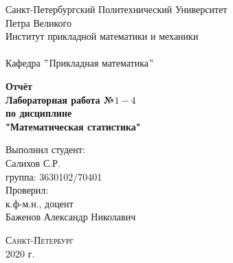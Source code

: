 \documentclass[a4]{article}
\begin{document}
	\def\contentsname{\LARGE{Содержание}}
	\thispagestyle{empty}
	\begin{center} 
		\vspace{2cm} 
		{\Large \sc Санкт-Петербургский Политехнический Университет}\\
		\vspace{2mm}
		{\Large\sc Петра Великого}\\
		\vspace{1cm}
		{\large \sc Институт прикладной математики и механики\\ 
			\vspace{0.5mm}
			\textsc{}}\\ 
		\vspace{0.5mm}
		{\large\sc Кафедра $"$Прикладная математика$"$}\\
		\vspace{15mm}
		
		
		{\sc \textbf{Отчёт\\
			Лабораторная работа №$1 - 4$\\
			по дисциплине\\
			"Математическая статистика"}
			\vspace{6mm}
			
		}
		\vspace*{2mm}
		
		
		\begin{flushleft}
			\vspace{4cm}
			\sc Выполнил студент:\\
			\sc Салихов С.Р.\\
			\sc группа: 3630102/70401\\
			\vspace{1cm}
			\sc Проверил:\\
			\sc к.ф-м.н., доцент\\
			\sc Баженов Александр Николавич
			\vspace{20mm}
		\end{flushleft}
	\end{center} 
	\begin{center}
		\vfill {\large\textsc{Санкт-Петербург}}\\ 
		2020 г.
	\end{center}
	
	\newpage
	\pagestyle{plain}
	
	
	
\end{document}
